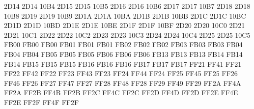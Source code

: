 \setcclcucx 2D14 2D14 10B4 %
\setcclcucx 2D15 2D15 10B5 %
\setcclcucx 2D16 2D16 10B6 %
\setcclcucx 2D17 2D17 10B7 %
\setcclcucx 2D18 2D18 10B8 %
\setcclcucx 2D19 2D19 10B9 %
\setcclcucx 2D1A 2D1A 10BA %
\setcclcucx 2D1B 2D1B 10BB %
\setcclcucx 2D1C 2D1C 10BC %
\setcclcucx 2D1D 2D1D 10BD %
\setcclcucx 2D1E 2D1E 10BE %
\setcclcucx 2D1F 2D1F 10BF %
\setcclcucx 2D20 2D20 10C0 %
\setcclcucx 2D21 2D21 10C1 %
\setcclcucx 2D22 2D22 10C2 %
\setcclcucx 2D23 2D23 10C3 %
\setcclcucx 2D24 2D24 10C4 %
\setcclcucx 2D25 2D25 10C5 %
\setcclcucx FB00 FB00 FB00 %
\setcclcucx FB01 FB01 FB01 %
\setcclcucx FB02 FB02 FB02 %
\setcclcucx FB03 FB03 FB03 %
\setcclcucx FB04 FB04 FB04 %
\setcclcucx FB05 FB05 FB05 %
\setcclcucx FB06 FB06 FB06 %
\setcclcucx FB13 FB13 FB13 %
\setcclcucx FB14 FB14 FB14 %
\setcclcucx FB15 FB15 FB15 %
\setcclcucx FB16 FB16 FB16 %
\setcclcucx FB17 FB17 FB17 %
\setcclcucx FF21 FF41 FF21 %
\setcclcucx FF22 FF42 FF22 %
\setcclcucx FF23 FF43 FF23 %
\setcclcucx FF24 FF44 FF24 %
\setcclcucx FF25 FF45 FF25 %
\setcclcucx FF26 FF46 FF26 %
\setcclcucx FF27 FF47 FF27 %
\setcclcucx FF28 FF48 FF28 %
\setcclcucx FF29 FF49 FF29 %
\setcclcucx FF2A FF4A FF2A %
\setcclcucx FF2B FF4B FF2B %
\setcclcucx FF2C FF4C FF2C %
\setcclcucx FF2D FF4D FF2D %
\setcclcucx FF2E FF4E FF2E %
\setcclcucx FF2F FF4F FF2F %
